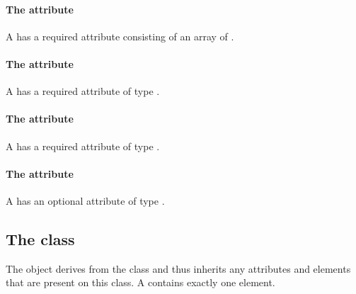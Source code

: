 \paragraph{The \fixttspace{} attribute}

A \ParametricObject has a required attribute 
consisting of an array of .


\paragraph{The \fixttspace{} attribute}

A \ParametricObject has a required attribute  of
type .


\paragraph{The \fixttspace{} attribute}

A \ParametricObject has a required attribute  of type
.


\paragraph{The \fixttspace{} attribute}

A \ParametricObject has an optional attribute  of type
.


\subsection{The  class}
\label{csgeometry-class}




The \CSGeometry object derives from the \GeometryDefinition class and
thus inherits any attributes and elements that are present on this
class.
A \CSGeometry contains exactly one \ListOfCsgObjects element.
